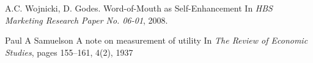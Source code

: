 \documentclass[sigconf]{acmart}
\begin{document}
\begin{thebibliography}{10}
\newblock A.C. Wojnicki, D. Godes. 
\newblock Word-of-Mouth as Self-Enhancement
\newblock In {\em HBS Marketing Research Paper No.
06-01}, 2008. 

\newblock Paul A Samuelson 
\newblock A note on measurement of utility
\newblock In {\em The Review of Economic Studies}, pages 155--161, 4(2), 1937

\end{thebibliography}
\end{document}
